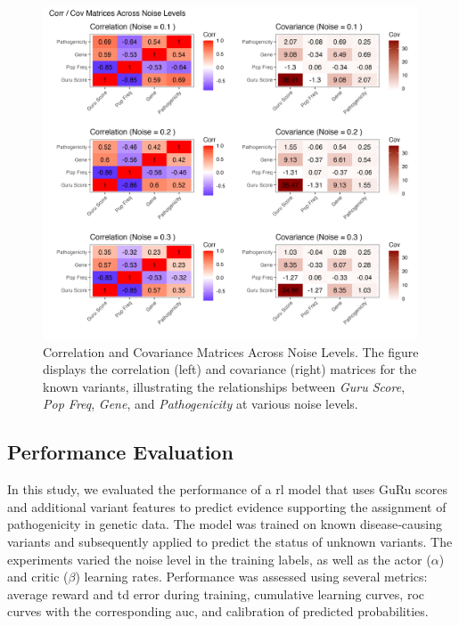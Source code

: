 \begin{figure}[h]
    \centering
    \includegraphics[width=0.99\textwidth]{../figures/data_matrices.png}
    \caption{Correlation and Covariance Matrices Across Noise Levels. The figure displays the correlation (left) and covariance (right) matrices for the known variants, illustrating the relationships between \emph{Guru Score}, \emph{Pop Freq}, \emph{Gene}, and \emph{Pathogenicity} at various noise levels.}
    \label{fig:data_matrices}
\end{figure}


\clearpage

\subsection{Performance Evaluation}

In this study, we evaluated the performance of a \ac{rl} model that uses GuRu scores and additional variant features to predict evidence supporting the assignment of pathogenicity in genetic data. The model was trained on known disease‐causing variants and subsequently applied to predict the status of unknown variants. The experiments varied the noise level in the training labels, as well as the actor ($\alpha$) and critic ($\beta$) learning rates. Performance was assessed using several metrics: average reward and \ac{td} error during training, cumulative learning curves, \ac{roc}  curves with the corresponding \ac{auc}, and calibration of predicted probabilities.

